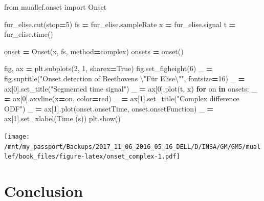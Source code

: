 \documentclass[
  american,
]{article}
\newenvironment{Shaded}{\begin{snugshade}}{\end{snugshade}}
\newcommand{\CharTok}[1]{\textcolor[rgb]{0.31,0.60,0.02}{#1}}
\newcommand{\ControlFlowTok}[1]{\textcolor[rgb]{0.13,0.29,0.53}{\textbf{#1}}}
\newcommand{\DecValTok}[1]{\textcolor[rgb]{0.00,0.00,0.81}{#1}}
\newcommand{\ImportTok}[1]{#1}
\newcommand{\KeywordTok}[1]{\textcolor[rgb]{0.13,0.29,0.53}{\textbf{#1}}}
\newcommand{\NormalTok}[1]{#1}
\newcommand{\OperatorTok}[1]{\textcolor[rgb]{0.81,0.36,0.00}{\textbf{#1}}}
\newcommand{\StringTok}[1]{\textcolor[rgb]{0.31,0.60,0.02}{#1}}
\newcommand{\VariableTok}[1]{\textcolor[rgb]{0.00,0.00,0.00}{#1}}
\begin{document}
\begin{Shaded}
\begin{Highlighting}[]
\ImportTok{from}\NormalTok{ muallef.onset }\ImportTok{import}\NormalTok{ Onset}

\NormalTok{fur\_elise.cut(stop}\OperatorTok{=}\DecValTok{5}\NormalTok{)}
\NormalTok{fs }\OperatorTok{=}\NormalTok{ fur\_elise.sampleRate}
\NormalTok{x }\OperatorTok{=}\NormalTok{ fur\_elise.signal}
\NormalTok{t }\OperatorTok{=}\NormalTok{ fur\_elise.time()}

\NormalTok{onset }\OperatorTok{=}\NormalTok{ Onset(x, fs, method}\OperatorTok{=}\StringTok{\textquotesingle{}complex\textquotesingle{}}\NormalTok{)}
\NormalTok{onsets }\OperatorTok{=}\NormalTok{ onset()}

\NormalTok{fig, ax }\OperatorTok{=}\NormalTok{ plt.subplots(}\DecValTok{2}\NormalTok{, }\DecValTok{1}\NormalTok{, sharex}\OperatorTok{=}\VariableTok{True}\NormalTok{)}
\NormalTok{fig.set\_figheight(}\DecValTok{6}\NormalTok{)}
\NormalTok{\_ }\OperatorTok{=}\NormalTok{ fig.suptitle(}\StringTok{"Onset detection of Beethoven\textquotesingle{}s }\CharTok{\textbackslash{}"}\StringTok{Für Elise}\CharTok{\textbackslash{}"}\StringTok{"}\NormalTok{, fontsize}\OperatorTok{=}\DecValTok{16}\NormalTok{)}
\NormalTok{\_ }\OperatorTok{=}\NormalTok{ ax[}\DecValTok{0}\NormalTok{].set\_title(}\StringTok{"Segmented time signal"}\NormalTok{)}
\NormalTok{\_ }\OperatorTok{=}\NormalTok{ ax[}\DecValTok{0}\NormalTok{].plot(t, x)}
\ControlFlowTok{for}\NormalTok{ on }\KeywordTok{in}\NormalTok{ onsets:}
\NormalTok{    \_ }\OperatorTok{=}\NormalTok{ ax[}\DecValTok{0}\NormalTok{].axvline(x}\OperatorTok{=}\NormalTok{on, color}\OperatorTok{=}\StringTok{\textquotesingle{}red\textquotesingle{}}\NormalTok{)}
\NormalTok{\_ }\OperatorTok{=}\NormalTok{ ax[}\DecValTok{1}\NormalTok{].set\_title(}\StringTok{"Complex difference ODF"}\NormalTok{)}
\NormalTok{\_ }\OperatorTok{=}\NormalTok{ ax[}\DecValTok{1}\NormalTok{].plot(onset.onsetTime, onset.onsetFunction)}
\NormalTok{\_ }\OperatorTok{=}\NormalTok{ ax[}\DecValTok{1}\NormalTok{].set\_xlabel(}\StringTok{\textquotesingle{}Time (s)\textquotesingle{}}\NormalTok{)}
\NormalTok{plt.show()}
\end{Highlighting}
\end{Shaded}

\texttt{[image: /mnt/my\_passport/Backups/2017\_11\_06\_2016\_05\_16\_DELL/D/INSA/GM/GM5/muallef/book\_files/figure-latex/onset\_complex-1.pdf]}

\pagebreak

\hypertarget{conclusion}{%
\section{Conclusion}\label{conclusion}}
\end{document}
